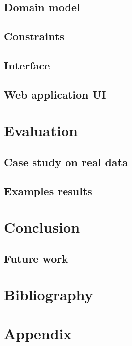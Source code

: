 \documentclass[12pt, a4paper, english]{report}
\begin{document}
\subsection{Domain model}
\subsection{Constraints}
\subsection{Interface}
\subsection{Web application UI}

\section{Evaluation}
\subsection{Case study on real data}
\subsection{Examples results}

\section{Conclusion}
\subsection{Future work}

\section{Bibliography}

\section{Appendix}
\end{document}
